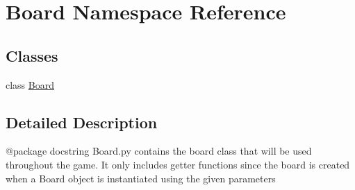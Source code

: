 \hypertarget{namespace_board}{}\section{Board Namespace Reference}
\label{namespace_board}
\subsection*{Classes}
\begin{DoxyCompactItemize}
\item 
class \hyperlink{class_board_1_1_board}{Board}
\end{DoxyCompactItemize}


\subsection{Detailed Description}
\begin{DoxyVerb}@package docstring
   Board.py contains the board class that will be used throughout the game. It
   only includes getter functions since the board is created when a Board object
   is instantiated using the given parameters
\end{DoxyVerb}
 